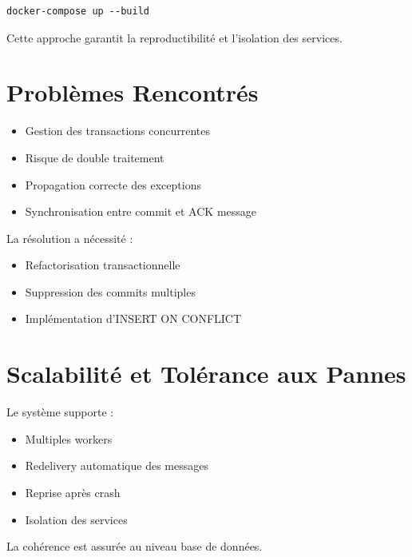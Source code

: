 \documentclass[12pt,a4paper]{article}
\begin{document}
\begin{verbatim}
docker-compose up --build
\end{verbatim}

Cette approche garantit la reproductibilité et l’isolation des services.

\section{Problèmes Rencontrés}

\begin{itemize}
\item Gestion des transactions concurrentes
\item Risque de double traitement
\item Propagation correcte des exceptions
\item Synchronisation entre commit et ACK message
\end{itemize}

La résolution a nécessité :

\begin{itemize}
\item Refactorisation transactionnelle
\item Suppression des commits multiples
\item Implémentation d’INSERT ON CONFLICT
\end{itemize}

\section{Scalabilité et Tolérance aux Pannes}

Le système supporte :

\begin{itemize}
\item Multiples workers
\item Redelivery automatique des messages
\item Reprise après crash
\item Isolation des services
\end{itemize}

La cohérence est assurée au niveau base de données.

\end{document}
